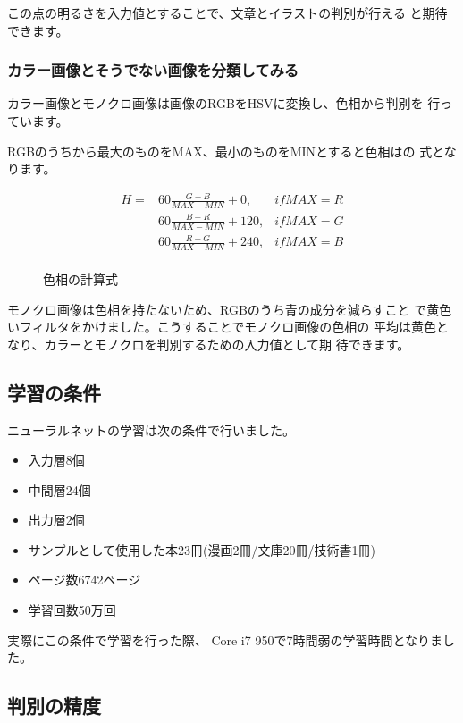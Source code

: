\documentclass[mingoth,a4paper]{jsarticle}
\begin{document}
この点の明るさを入力値とすることで、文章とイラストの判別が行える
と期待できます。

\subsubsection{カラー画像とそうでない画像を分類してみる}

カラー画像とモノクロ画像は画像のRGBをHSVに変換し、色相から判別を
行っています。

RGBのうちから最大のものをMAX、最小のものをMINとすると色相はの
式となります。

\begin{figure}[H]
\begin{center}
\begin{align*}
 H = & 60 \frac{G-B}{MAX-MIN} + 0, & if MAX = R\\
     & 60 \frac{B-R}{MAX-MIN} + 120,   & if MAX = G\\
     & 60 \frac{R-G}{MAX-MIN} + 240,   & if MAX = B\\
\end{align*}
\caption{色相の計算式}
\label{fig:cal-hue}
\end{center}
\end{figure}

モノクロ画像は色相を持たないため、RGBのうち青の成分を減らすこと
で黄色いフィルタをかけました。こうすることでモノクロ画像の色相の
平均は黄色となり、カラーとモノクロを判別するための入力値として期
待できます。

\subsection{学習の条件}

ニューラルネットの学習は次の条件で行いました。

\begin{itemize}
\item 入力層8個
\item 中間層24個
\item 出力層2個
\item サンプルとして使用した本23冊(漫画2冊/文庫20冊/技術書1冊)
\item ページ数6742ページ
\item 学習回数50万回
\end{itemize}

実際にこの条件で学習を行った際、
Core i7 950で7時間弱の学習時間となりました。

\subsection{判別の精度}
\end{document}
